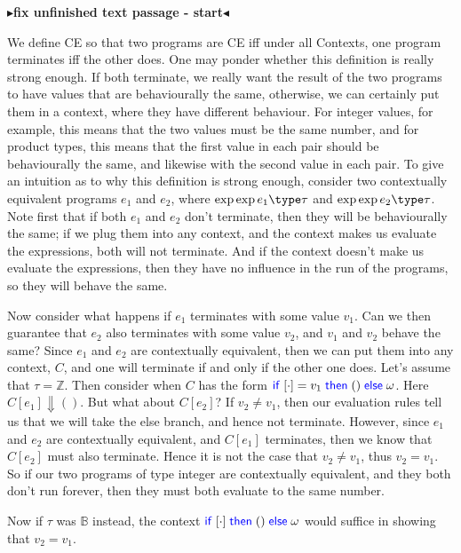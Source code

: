 \documentclass[twoside,11pt,openright]{report}
\theoremstyle{definition}
\newcommand{\Keyword}[1]{{\color{blue} \mathsf{#1}}}
\newcommand{\expr}{e}
\newcommand{\val}{v}
\newcommand{\TT}{()}
\newcommand{\IfCmd}{\Keyword{if}}
\newcommand{\ThenCmd}{\Keyword{then}}
\newcommand{\ElseCmd}{\Keyword{else}}
\def\If#1then#2else#3{\IfCmd{}\;#1\;\ThenCmd{}\;#2\;\ElseCmd{}\;#3}
\newcommand{\empctx}{[\cdot]}
\newcommand{\ctx}{C}
\newcommand{\Tint}{\mathbb{Z}}
\newcommand{\Tbool}{\mathbb{B}}
\newcommand{\typ}{\tau}
\newcommand{\empvenv}{\bullet}
\newcommand{\emptenv}{\bullet}
\def\envs#1#2\exp#3\type#4{#1 \; | \; #2 \; \vdash #3 : #4}
\newcommand{\todo}[1]{{\color[rgb]{.5,0,0}\textbf{$\blacktriangleright$#1$\blacktriangleleft$}}}
\begin{document}
\todo{fix unfinished text passage - start}

We define CE so that two programs are CE iff under all Contexts, one program terminates iff the other does. One may ponder whether this definition is really strong enough. If both terminate, we really want the result of the two programs to have values that are behaviourally the same, otherwise, we can certainly put them in a context, where they have different behaviour.
For integer values, for example, this means that the two values must be the same number, and for product types, this means that the first value in each pair should be behaviourally the same, and likewise with the second value in each pair.
To give an intuition as to  why this definition is strong enough, consider two contextually equivalent programs $\expr_1$ and $\expr_2$, where $\envs \emptenv \empvenv \exp \expr_1 \type \typ$ and $\envs \emptenv \empvenv \exp \expr_2 \type \typ$.
Note first that if both $\expr_1$ and $\expr_2$ don't terminate, then they will be behaviourally the same; if we plug them into any context, and the context makes us evaluate the expressions, both will not terminate. And if the context doesn't make us evaluate the expressions, then they have no influence in the run of the programs, so they will behave the same.

Now consider what happens if $\expr_1$ terminates with some value $\val_1$. Can we then guarantee that $\expr_2$ also terminates with some value $\val_2$, and $\val_1$ and $\val_2$ behave the same? Since $\expr_1$ and $\expr_2$ are contextually equivalent, then we can put them into any context, $\ctx$, and one will terminate if and only if the other one does.
Let's assume that $\typ = \Tint$. Then consider when $\ctx$ has the form $\If \empctx = \val_1 then \TT else \omega$. Here $\ctx[\expr_1] \Downarrow \TT$. But what about $\ctx[\expr_2]$? If $\val_2 \neq \val_1$, then our evaluation rules tell us that we will take the else branch, and hence not terminate. However, since $\expr_1$ and $\expr_2$ are contextually equivalent, and $\ctx[\expr_1]$ terminates, then we know that $\ctx[\expr_2]$ must also terminate. Hence it is not the case that $\val_2 \neq \val_1$, thus $\val_2 = \val_1$. So if our two programs of type integer are contextually equivalent, and they both don't run forever, then they must both evaluate to the same number.

Now if $\typ$ was $\Tbool$ instead, the context $\If \empctx then \TT else \omega$ would suffice in showing that $\val_2 = \val_1$. 
\end{document}
